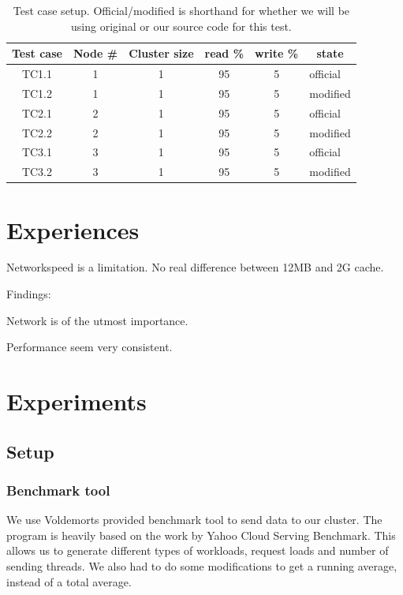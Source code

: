 \begin{center}
\begin{table}[h]
	\begin{tabular}{|c|c|c|c|c|l|}
		\multicolumn{1}{c}{Test case} & 
		\multicolumn{1}{c}{Node \#} &
		\multicolumn{1}{c}{Cluster size} &  
		\multicolumn{1}{c}{read \%} & 
		\multicolumn{1}{c}{write \%} & 
		\multicolumn{1}{c}{state} \\
		\hline

		TC1.1 & 1 & 1 & 95 & 5 & official \\
		TC1.2 & 1 & 1 & 95 & 5 & modified \\
		\hline
		TC2.1 & 2 & 1 & 95 & 5 & official \\
		TC2.2 & 2 & 1 & 95 & 5 & modified \\
		\hline
		TC3.1 & 3 & 1 & 95 & 5 & official \\
		TC3.2 & 3 & 1 & 95 & 5 & modified \\

		\hline
	\end{tabular}
	\caption{Test case setup. Official/modified is shorthand for whether we will be using original or our source code for this test.}
	\label{tbl:testcases}
\end{table}
\end{center}

\section{Experiences}
Networkspeed is a limitation. 
No real difference between 12MB and 2G cache. 


Findings:

Network is of the utmost importance.

Performance seem very consistent.





\section{Experiments}
\subsection{Setup}
\subsubsection{Benchmark tool}
We use Voldemorts provided benchmark tool to send data to our cluster. The program is heavily based on the work by Yahoo Cloud Serving Benchmark. This allows us to generate different types of workloads, request loads and number of sending threads. We also had to do some modifications to get a running average, instead of a total average.

